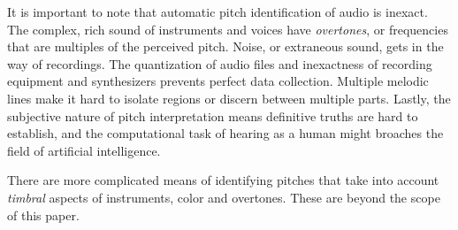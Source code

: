 It is important to note that automatic pitch identification of audio is inexact. The complex, rich sound of instruments and voices have \textit{overtones}, or frequencies that are multiples of the perceived pitch. Noise, or extraneous sound, gets in the way of recordings. The quantization of audio files and inexactness of recording equipment and synthesizers prevents perfect data collection. Multiple melodic lines make it hard to isolate regions or discern between multiple parts. Lastly, the subjective nature of pitch interpretation means definitive truths are hard to establish, and the computational task of hearing as a human might broaches the field of artificial intelligence.

There are more complicated means of identifying pitches that take into account \textit{timbral} aspects of instruments, color and overtones. These are beyond the scope of this paper.